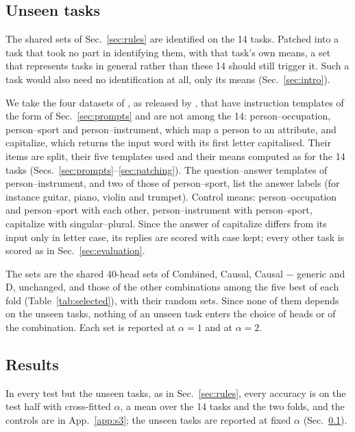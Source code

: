 \documentclass[10pt,a4paper]{article}
\begin{document}
\subsection{Unseen tasks}\label{sec:unseen}

The shared sets of Sec.~\ref{sec:rules} are identified on the 14 tasks. Patched into a task that took no part in identifying them, with that task's own means, a set that represents tasks in general rather than these 14 should still trigger it. Such a task would also need no identification at all, only its means (Sec.~\ref{sec:intro}).

We take the four datasets of \citet{todd2024function}, as released by \citet{yang2026shared}, that have instruction templates of the form of Sec.~\ref{sec:prompts} and are not among the 14: person--occupation, person--sport and person--instrument, which map a person to an attribute, and capitalize, which returns the input word with its first letter capitalised. Their items are split, their five templates used and their means computed as for the 14 tasks (Secs.~\ref{sec:prompts}--\ref{sec:patching}). The question--answer templates of person--instrument, and two of those of person--sport, list the answer labels (for instance guitar, piano, violin and trumpet). Control means: person--occupation and person--sport with each other, person--instrument with person--sport, capitalize with singular--plural. Since the answer of capitalize differs from its input only in letter case, its replies are scored with case kept; every other task is scored as in Sec.~\ref{sec:evaluation}.

The sets are the shared 40-head sets of Combined, Causal, Causal $-$ generic and D, unchanged, and those of the other combinations among the five best of each fold (Table~\ref{tab:selected}), with their random sets. Since none of them depends on the unseen tasks, nothing of an unseen task enters the choice of heads or of the combination. Each set is reported at $\alpha=1$ and at $\alpha=2$.

\subsection{Results}\label{sec:beyond-results}

In every test but the unseen tasks, as in Sec.~\ref{sec:rules}, every accuracy is on the test half with cross-fitted $\alpha$, a mean over the 14 tasks and the two folds, and the controls are in App.~\ref{app:s3}; the unseen tasks are reported at fixed $\alpha$ (Sec.~\ref{sec:unseen}).
\end{document}
